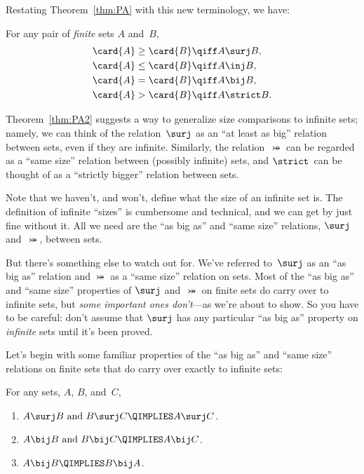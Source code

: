 Restating Theorem~\ref{thm:PA} with this new terminology, we have:
\begin{theorem}\label{thm:PA2}
For any pair of \emph{finite} sets $A$ and~$B$,
\begin{align*}
    \card{A} \ge \card{B} & \qiff A \surj B, \\
    \card{A} \le \card{B} & \qiff A \inj B, \\
    \card{A} = \card{B} & \qiff A \bij B, \\
    \card{A} > \card{B} & \qiff A \strict B.
\end{align*}
\end{theorem}

Theorem~\ref{thm:PA2} suggests a way to generalize size comparisons
to infinite sets; namely, we can think of the relation~$\surj$ as an
``at least as big'' relation between sets, even if they are infinite.
Similarly, the relation~$\bij$ can be regarded as a ``same size''
relation between (possibly infinite) sets, and $\strict$~can be
thought of as a ``strictly bigger'' relation between sets.

Note that we haven't, and won't, define what the size of an infinite
set is.  The definition of infinite ``sizes'' is cumbersome and
technical, and we can get by just fine without it.  All we need are
the ``as big as'' and ``same size'' relations, $\surj$ and~$\bij$,
between sets.

But there's something else to watch out for.  We've referred
to~$\surj$ as an ``as big as'' relation and $\bij$ as a ``same size''
relation on sets.  Most of the ``as big as'' and ``same
size'' properties of $\surj$ and~$\bij$ on finite sets do carry over
to infinite sets, but \emph{some important ones don't}---as we're
about to show.  So you have to be careful: don't assume that $\surj$
has any particular ``as big as'' property on \emph{infinite} sets
until it's been proved.

Let's begin with some familiar properties of the ``as big as'' and
``same size'' relations on finite sets that do carry over exactly to
infinite sets:

\begin{theorem}\label{thm:infinite1}
For any sets, $A$, $B$, and~$C$,
\begin{enumerate}

\item
$\text{$A \surj B$ and $B \surj C$} \QIMPLIES A \surj C$.

\item
$\text{$A \bij B$ and $B \bij C$} \QIMPLIES A \bij C$.

\item
$A \bij B  \QIMPLIES B \bij A$.
\end{enumerate}
\end{theorem}

